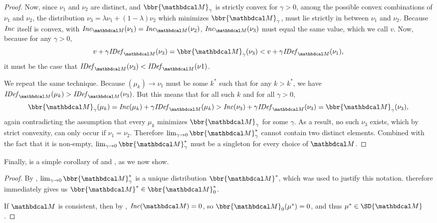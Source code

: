 \begin{proof}
Now, since $\nu_1$ and $\nu_2$ are distinct, and $\bbr{\dg M}_\gamma$ is strictly convex for $\gamma > 0$, among the possible convex combinations of $\nu_1$ and $\nu_2$, the distribution $\nu_3 = \lambda \nu_1 + (1-\lambda) \nu_2$ which minimizes $\bbr{\dg M}_\gamma$, must lie strictly in between $\nu_1$ and $\nu_2$.
Because $\mathit{Inc}$ itself is convex, with $\Inc_{\dg M}(\nu_1) = \Inc_{\dg M}(\nu_2)$, $\Inc_{\dg M}(\nu_3)$ must equal the same value, which we call $v$.
Now, because for any $\gamma > 0$,
\[ v + \gamma \IDef{\dg M}(\nu_3) = \bbr{\dg M}_\gamma(\nu_3)
 	< v + \gamma \IDef{\dg M}(\nu_1), \] 
it must be the case that $\IDef{\dg M}(\nu_3) < \IDef{\dg M}(\nu 1)$. 

We repeat the same technique. Because $(\mu_k) \to \nu_1$ must be some $k^*$ such that for any $k > k^*$, we have $\IDef{\dg M}(\mu_k) > \IDef{\dg M}(\nu_3)$. But this means that for all such $k$ and for all $\gamma > 0$,
\[ \bbr{\dg M}_\gamma(\mu_k) = \Inc(\mu_k) + \gamma\IDef{\dg M}(\mu_k) > \Inc(\nu_3) 
+ \gamma \IDef{\dg M}(\nu_3) = \bbr{\dg M}_\gamma(\nu_3),\]
again contradicting the assumption that every $\mu_k$ minimizes $\bbr{\dg M}_\gamma$ for some $\gamma$. As a result, no such $\nu_3$ exists, which by strict convexity, can only occur if $\nu_1 = \nu_2$. Therefore $\lim_{\gamma \to 0}\bbr{\dg M}_\gamma^*$ cannot contain two distinct elements. Combined with the fact that it is non-empty, $\lim_{\gamma \to 0}\bbr{\dg M}_\gamma^*$ must be a singleton for every choice of $\dg M$.
\end{proof}

Finally,  is a simple corollary of  and , as we now show. 
{}

\begin{proof}
By , $\lim_{\gamma \to 0}\bbr{\dg M}_\gamma^*$ is a unique distribution $\bbr{\dg M}^*$, which was used to justify this notation.   therefore immediately gives us $ \bbr{\dg M}^* \in \bbr{\dg M}_0^*$. 

If $\dg M$ is consistent, then by ,
$\Inc({\dg M}) = 0$, so $\bbr{\dg M}_0(\mu^*) = 0$, and thus $\mu^*
\in \SD{\dg M}$. 

\end{proof}


